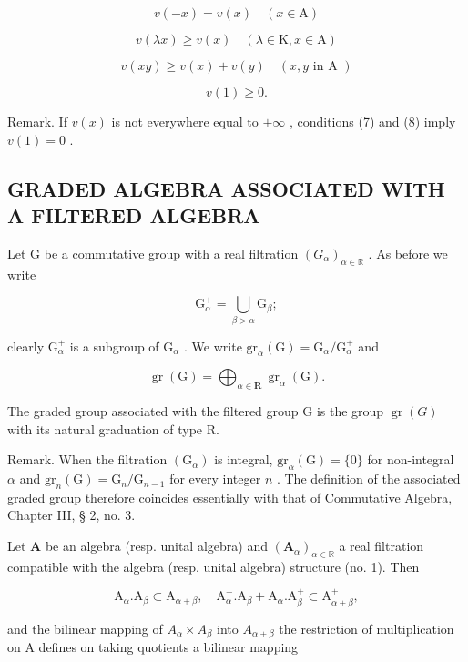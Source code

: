 \[
v (- x) = v (x) \quad (x \in \mathrm{A})\tag{6}
\]

\[
v (\lambda x) \geqslant v (x) \quad (\lambda \in \mathrm{K}, x \in \mathrm{A})\tag{7}
\]

\[
v (x y) \geqslant v (x) + v (y) \quad (x, y \text {   in   A })\tag{8}
\]

\[
v (1) \geqslant 0.
\]

Remark. If \(v(x)\) is not everywhere equal to \(+\infty\) , conditions (7) and (8) imply \(v(1) = 0\) .

\subsection{GRADED ALGEBRA ASSOCIATED WITH A FILTERED ALGEBRA}

Let G be a commutative group with a real filtration \((G_{\alpha})_{\alpha \in \mathbb{R}}\) . As before we write

\[
\mathrm{G} _ {\alpha} ^ {+} = \bigcup_ {\beta > \alpha} \mathrm{G} _ {\beta};\tag{9}
\]

clearly \(\mathrm{G}_{\alpha}^{+}\) is a subgroup of \(\mathrm{G}_{\alpha}\) . We write \(\mathrm{gr}_{\alpha}(\mathrm{G}) = \mathrm{G}_{\alpha} / \mathrm{G}_{\alpha}^{+}\) and

\[
\operatorname{gr} (\mathrm{G}) = \bigoplus_ {\alpha \in \mathbf {R}} \operatorname{gr} _ {\alpha} (\mathrm{G}).
\]

The graded group associated with the filtered group G is the group \(\operatorname{gr}(G)\) with its natural graduation of type R.

Remark. When the filtration \((\mathrm{G}_{\alpha})\) is integral, \(\mathrm{gr}_{\alpha}(\mathrm{G}) = \{0\}\) for non-integral \(\alpha\) and \(\mathrm{gr}_n(\mathrm{G}) = \mathrm{G}_n / \mathrm{G}_{n - 1}\) for every integer \(n\) . The definition of the associated graded group therefore coincides essentially with that of Commutative Algebra, Chapter III, § 2, no. 3.

Let \(\mathbf{A}\) be an algebra (resp. unital algebra) and \((\mathbf{A}_{\alpha})_{\alpha \in \mathbb{R}}\) a real filtration compatible with the algebra (resp. unital algebra) structure (no. 1). Then

\[
\mathrm{A} _ {\alpha}. \mathrm{A} _ {\beta} \subset \mathrm{A} _ {\alpha + \beta}, \quad \mathrm{A} _ {\alpha} ^ {+}. \mathrm{A} _ {\beta} + \mathrm{A} _ {\alpha}. \mathrm{A} _ {\beta} ^ {+} \subset \mathrm{A} _ {\alpha + \beta} ^ {+},
\]

and the bilinear mapping of \(A_{\alpha} \times A_{\beta}\) into \(A_{\alpha+\beta}\) the restriction of multiplication on A defines on taking quotients a bilinear mapping


